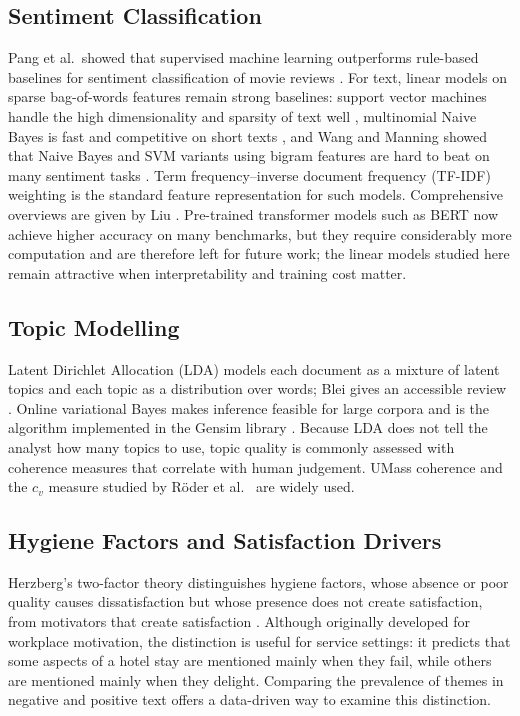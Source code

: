 \documentclass[11pt,journal,draftclsnofoot,onecolumn]{IEEEtran}
\begin{document}
\subsection{Sentiment Classification}
Pang et al.\ showed that supervised machine learning outperforms rule-based baselines for sentiment classification of movie reviews \cite{pang2002}. For text, linear models on sparse bag-of-words features remain strong baselines: support vector machines handle the high dimensionality and sparsity of text well \cite{joachims1998}, multinomial Naive Bayes is fast and competitive on short texts \cite{mccallum1998}, and Wang and Manning showed that Naive Bayes and SVM variants using bigram features are hard to beat on many sentiment tasks \cite{wang2012}. Term frequency--inverse document frequency (TF-IDF) weighting \cite{salton1988} is the standard feature representation for such models. Comprehensive overviews are given by Liu \cite{liu2012}. Pre-trained transformer models such as BERT \cite{devlin2019} now achieve higher accuracy on many benchmarks, but they require considerably more computation and are therefore left for future work; the linear models studied here remain attractive when interpretability and training cost matter.

\subsection{Topic Modelling}
Latent Dirichlet Allocation (LDA) \cite{blei2003} models each document as a mixture of latent topics and each topic as a distribution over words; Blei gives an accessible review \cite{blei2012}. Online variational Bayes \cite{hoffman2010} makes inference feasible for large corpora and is the algorithm implemented in the Gensim library \cite{rehurek2010}. Because LDA does not tell the analyst how many topics to use, topic quality is commonly assessed with coherence measures that correlate with human judgement. UMass coherence \cite{mimno2011} and the $c_v$ measure studied by R\"oder et al.\ \cite{roder2015} are widely used.

\subsection{Hygiene Factors and Satisfaction Drivers}
Herzberg's two-factor theory distinguishes hygiene factors, whose absence or poor quality causes dissatisfaction but whose presence does not create satisfaction, from motivators that create satisfaction \cite{herzberg1959}. Although originally developed for workplace motivation, the distinction is useful for service settings: it predicts that some aspects of a hotel stay are mentioned mainly when they fail, while others are mentioned mainly when they delight. Comparing the prevalence of themes in negative and positive text offers a data-driven way to examine this distinction.
\end{document}
